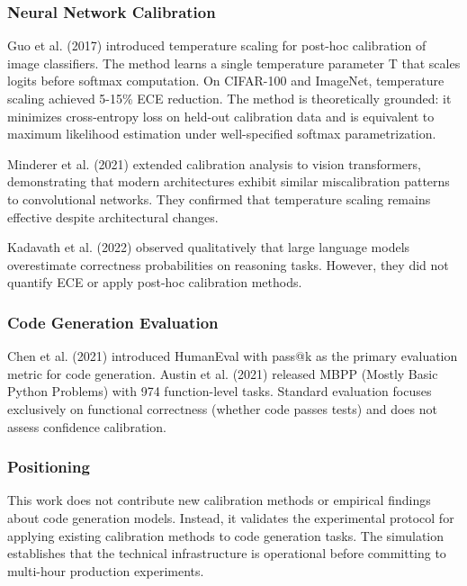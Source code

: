 
\subsubsection{Neural Network Calibration}

Guo et al. (2017) introduced temperature scaling for post-hoc calibration of image classifiers. The method learns a single temperature parameter T that scales logits before softmax computation. On CIFAR-100 and ImageNet, temperature scaling achieved 5-15\% ECE reduction. The method is theoretically grounded: it minimizes cross-entropy loss on held-out calibration data and is equivalent to maximum likelihood estimation under well-specified softmax parametrization.

Minderer et al. (2021) extended calibration analysis to vision transformers, demonstrating that modern architectures exhibit similar miscalibration patterns to convolutional networks. They confirmed that temperature scaling remains effective despite architectural changes.

Kadavath et al. (2022) observed qualitatively that large language models overestimate correctness probabilities on reasoning tasks. However, they did not quantify ECE or apply post-hoc calibration methods.

\subsubsection{Code Generation Evaluation}

Chen et al. (2021) introduced HumanEval with pass@k as the primary evaluation metric for code generation. Austin et al. (2021) released MBPP (Mostly Basic Python Problems) with 974 function-level tasks. Standard evaluation focuses exclusively on functional correctness (whether code passes tests) and does not assess confidence calibration.

\subsubsection{Positioning}

This work does not contribute new calibration methods or empirical findings about code generation models. Instead, it validates the experimental protocol for applying existing calibration methods \citep{guo2017calibration} to code generation tasks. The simulation establishes that the technical infrastructure is operational before committing to multi-hour production experiments.

